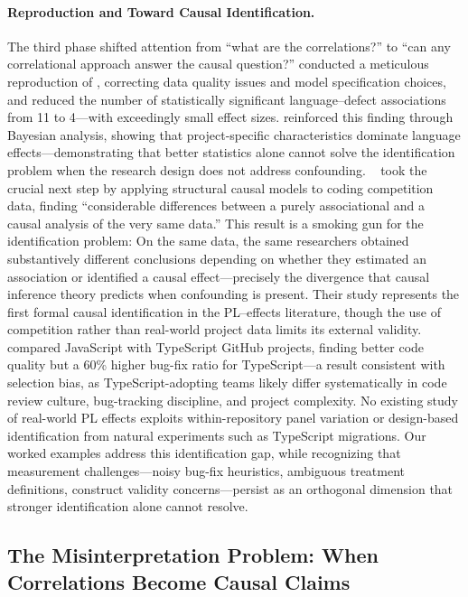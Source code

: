 \paragraph{Reproduction and Toward Causal Identification.}
The third phase shifted attention from ``what are the correlations?'' to ``can any correlational approach answer the causal question?''
\citet{DBLP:journals/toplas/BergerHMVV19} conducted a meticulous reproduction of \citet{DBLP:conf/sigsoft/RayPFD14}, correcting data quality issues and model specification choices, and reduced the number of statistically significant language--defect associations from 11 to 4---with exceedingly small effect sizes.
\citet{DBLP:journals/tosem/FuriaTF22} reinforced this finding through Bayesian analysis, showing that project-specific characteristics dominate language effects---demonstrating that better statistics alone cannot solve the identification problem when the research design does not address confounding.
\citeauthor{DBLP:journals/tosem/FuriaTF24}~\cite{DBLP:journals/tosem/FuriaTF24} took the crucial next step by applying structural causal models to coding competition data, finding ``considerable differences between a purely associational and a causal analysis of the very same data.''
This result is a smoking gun for the identification problem: On the same data, the same researchers obtained substantively different conclusions depending on whether they estimated an association or identified a causal effect---precisely the divergence that causal inference theory predicts when confounding is present.
Their study represents the first formal causal identification in the PL--effects literature, though the use of competition rather than real-world project data limits its external validity.
\citet{DBLP:conf/msr/BognerM22} compared JavaScript with TypeScript GitHub projects, finding better code quality but a 60\% higher bug-fix ratio for TypeScript---a result consistent with selection bias, as TypeScript-adopting teams likely differ systematically in code review culture, bug-tracking discipline, and project complexity.
No existing study of real-world PL effects exploits within-repository panel variation or design-based identification from natural experiments such as TypeScript migrations.
Our worked examples address this identification gap, while recognizing that measurement challenges---noisy bug-fix heuristics, ambiguous treatment definitions, construct validity concerns---persist as an orthogonal dimension that stronger identification alone cannot resolve.

\subsection{The Misinterpretation Problem: When Correlations Become Causal Claims}
\label{sec:pl-misinterpretation}


